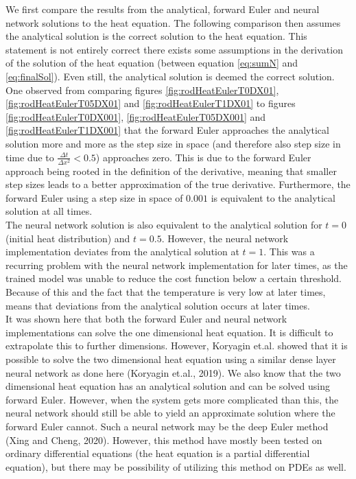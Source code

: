 \documentclass[12pt,a4paper]{article}
\begin{document}
\noindent We first compare the results from the analytical, forward Euler and neural network solutions to the heat equation. The following comparison then assumes the analytical solution is the correct solution to the heat equation. This statement is not entirely correct there exists some assumptions in the derivation of the solution of the heat equation (between equation \ref{eq:sumN} and \ref{eq:finalSol}). Even still, the analytical solution is deemed the correct solution. 
\\
One observed from comparing figures \ref{fig:rodHeatEulerT0DX01}, \ref{fig:rodHeatEulerT05DX01} and \ref{fig:rodHeatEulerT1DX01} to figures \ref{fig:rodHeatEulerT0DX001}, \ref{fig:rodHeatEulerT05DX001} and \ref{fig:rodHeatEulerT1DX001} that the forward Euler approaches the analytical solution more and more as the step size in space (and therefore also step size in time due to $\frac{\Delta t}{\Delta x^2} < 0.5$) approaches zero. This is due to the forward Euler approach being rooted in the definition of the derivative, meaning that smaller step sizes leads to a better approximation of the true derivative. Furthermore, the forward Euler using a step size in space of $0.001$ is equivalent to the analytical solution at all times.
\\
The neural network solution is also equivalent to the analytical solution for $t = 0$ (initial heat distribution) and $t = 0.5$. However, the neural network implementation deviates from the analytical solution at $t = 1$. This was a recurring problem with the neural network implementation for later times, as the trained model was unable to reduce the cost function below a certain threshold. Because of this and the fact that the temperature is very low at later times, means that deviations from the analytical solution occurs at later times.
\\
It was shown here that both the forward Euler and neural network implementations can solve the one dimensional heat equation. It is difficult to extrapolate this to further dimensions. However, Koryagin et.al. showed that it is possible to solve the two dimensional heat equation using a similar dense layer neural network as done here (Koryagin et.al., 2019). We also know that the two dimensional heat equation has an analytical solution and can be solved using forward Euler. However, when the system gets more complicated than this, the neural network should still be able to yield an approximate solution where the forward Euler cannot. Such a neural network may be the deep Euler method (Xing and Cheng, 2020). However, this method have mostly been tested on ordinary differential equations (the heat equation is a partial differential equation), but there may be possibility of utilizing this method on PDEs as well. 
\end{document}
